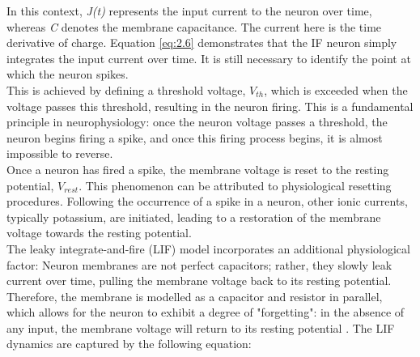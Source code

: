 \noindent In this context, \textit{J(t)} represents the input current to the neuron over time, whereas \textit{C} denotes the membrane capacitance. The current here is the time derivative of charge. Equation \ref{eq:2.6} demonstrates that the IF neuron simply integrates the input current over time. It is still necessary to identify the point at which the neuron spikes. \\

\noindent This is achieved by defining a threshold voltage, $V_{th}$, which is exceeded when the voltage passes this threshold, resulting in the neuron firing. This is a fundamental principle in neurophysiology: once the neuron voltage passes a threshold, the neuron begins firing a spike, and once this firing process begins, it is almost impossible to reverse. \\

\noindent Once a neuron has fired a spike, the membrane voltage is reset to the resting potential, $V_{rest}$. This phenomenon can be attributed to physiological resetting procedures. Following the occurrence of a spike in a neuron, other ionic currents, typically potassium, are initiated, leading to a restoration of the membrane voltage towards the resting potential.\\


\noindent The leaky integrate-and-fire (LIF) model \cite{knight1972dynamics} incorporates an additional physiological factor: Neuron membranes are not perfect capacitors; rather, they slowly leak current over time, pulling the membrane voltage back to its resting potential. Therefore, the membrane is modelled as a capacitor and resistor in parallel, which allows for the neuron to exhibit a degree of "forgetting": in the absence of any input, the membrane voltage will return to its resting potential \cite{koch2004biophysics}. The LIF dynamics are captured by the following equation:

